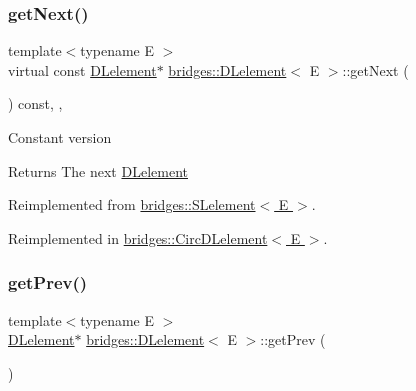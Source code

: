 \hypertarget{classbridges_1_1_d_lelement_a648012849263b4b1cd2d504d5e5fd880}{}\label{classbridges_1_1_d_lelement_a648012849263b4b1cd2d504d5e5fd880} 
\subsubsection{\texorpdfstring{get\+Next()}{getNext()}\hspace{0.1cm}{\footnotesize\ttfamily [2/2]}}
{\footnotesize\ttfamily template$<$typename E $>$ \\
virtual const \hyperlink{classbridges_1_1_d_lelement}{D\+Lelement}$\ast$ \hyperlink{classbridges_1_1_d_lelement}{bridges\+::\+D\+Lelement}$<$ E $>$\+::get\+Next (\begin{DoxyParamCaption}{ }\end{DoxyParamCaption}) const\hspace{0.3cm}{\ttfamily [inline]}, {\ttfamily [override]}, {\ttfamily [virtual]}}

Constant version

\begin{DoxyReturn}{Returns}
The next \hyperlink{classbridges_1_1_d_lelement}{D\+Lelement} 
\end{DoxyReturn}


Reimplemented from \hyperlink{classbridges_1_1_s_lelement_a4422b7731a84734d312b8cd8e241b1e8}{bridges\+::\+S\+Lelement$<$ E $>$}.



Reimplemented in \hyperlink{classbridges_1_1_circ_d_lelement_ad02db972b2a525de01855bfed1a45ea4}{bridges\+::\+Circ\+D\+Lelement$<$ E $>$}.

\hypertarget{classbridges_1_1_d_lelement_a5b0316fb255d022b0dc3065d681fc2a7}{}\label{classbridges_1_1_d_lelement_a5b0316fb255d022b0dc3065d681fc2a7} 
\subsubsection{\texorpdfstring{get\+Prev()}{getPrev()}\hspace{0.1cm}{\footnotesize\ttfamily [1/2]}}
{\footnotesize\ttfamily template$<$typename E $>$ \\
\hyperlink{classbridges_1_1_d_lelement}{D\+Lelement}$\ast$ \hyperlink{classbridges_1_1_d_lelement}{bridges\+::\+D\+Lelement}$<$ E $>$\+::get\+Prev (\begin{DoxyParamCaption}{ }\end{DoxyParamCaption})\hspace{0.3cm}{\ttfamily [inline]}}


